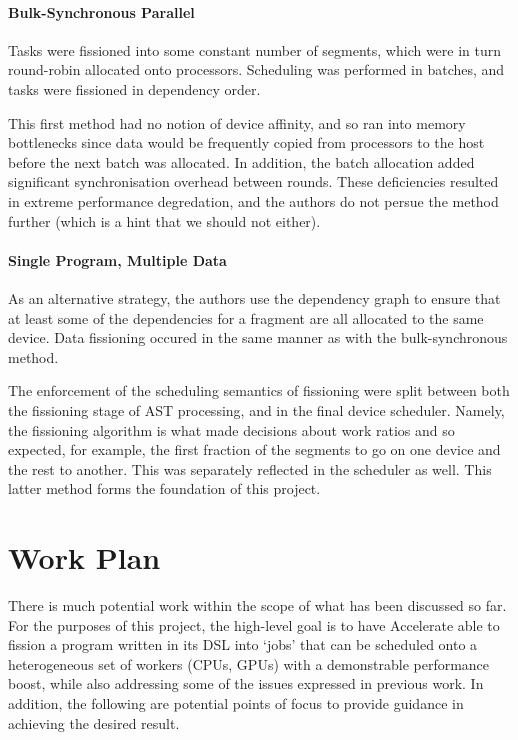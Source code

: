 \documentclass[a4paper,12pt]{article}
\begin{document}
\paragraph*{Bulk-Synchronous Parallel} 
Tasks were fissioned into some constant number of segments, which were in turn round-robin allocated onto processors.
Scheduling was performed in batches, and tasks were fissioned in dependency order.

This first method had no notion of device affinity, and so ran into memory bottlenecks since data would be frequently copied from processors to the host before the next batch was allocated.
In addition, the batch allocation added significant synchronisation overhead between rounds.
These deficiencies resulted in extreme performance degredation, and the authors do not persue the method further (which is a hint that we should not either).

\paragraph*{Single Program, Multiple Data}
As an alternative strategy, the authors use the dependency graph to ensure that at least some of the dependencies for a fragment are all allocated to the same device.
Data fissioning occured in the same manner as with the bulk-synchronous method.

The enforcement of the scheduling semantics of fissioning were split between both the fissioning stage of AST processing, and in the final device scheduler.
Namely, the fissioning algorithm is what made decisions about work ratios and so expected, for example, the first fraction of the segments to go on one device and the rest to another.
This was separately reflected in the scheduler as well. This latter method forms the foundation of this project.

\section{Work Plan}
There is much potential work within the scope of what has been discussed so far.
For the purposes of this project, the high-level goal is to have Accelerate able to fission a program written in its DSL into `jobs' that can be scheduled onto a heterogeneous set of workers (CPUs, GPUs) with a demonstrable performance boost, while also addressing some of the issues expressed in previous work.
In addition, the following are potential points of focus to provide guidance in achieving the desired result.
\end{document}
